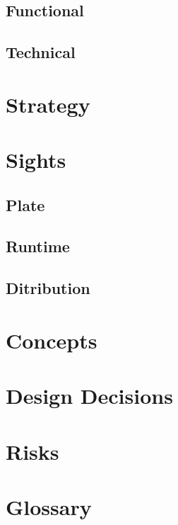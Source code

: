 \documentclass[11pt]{article}
\begin{document}
        \subsection{Functional}
        \subsection{Technical}

    \section{Strategy}

    \section{Sights}

        \subsection{Plate}
        \subsection{Runtime}
        \subsection{Ditribution}

    \section{Concepts}

    \section{Design Decisions}

    \section{Risks}

    \section{Glossary}
\end{document}
